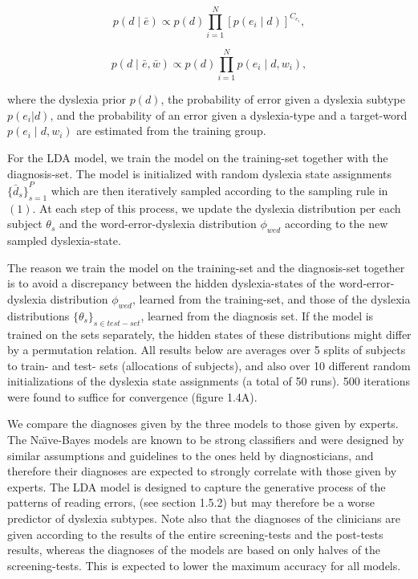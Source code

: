{{{\begin{equation}
p(d \mid \bar{e}) \propto p(d) \prod_{i = 1}^N [p(e_i \mid d)]^{C_{e_i}},
\end{equation}

\begin{equation}
p(d \mid \bar{e}, \bar{w}) \propto p(d) \prod_{i = 1}^N p(e_i \mid d, w_i),
\end{equation}

where the dyslexia prior $ p(d) $, the probability of error given a dyslexia subtype $ p(e_i |d) $, and the probability of an error given a dyslexia-type and a target-word $ p(e_i \mid d,w_i ) $ are estimated from the training group.

For the LDA model, we train the model on the training-set together with the diagnosis-set. The model is initialized with random dyslexia state assignments $ { \{ \bar{d}_{s} \} }_{s=1}^P $ which are then iteratively sampled according to the sampling rule in $(1)$. At each step of this process, we update the dyslexia distribution per each subject $ \theta_{s} $ and the word-error-dyslexia distribution $ \phi_{wed} $ according to the new sampled dyslexia-state.

The reason we train the model on the training-set and the diagnosis-set together is to avoid a discrepancy between the hidden dyslexia-states of the word-error-dyslexia distribution $ \phi_{wed} $, learned from the training-set, and those of the dyslexia distributions $ { \{ \theta_{s} \} }_{s \in test-set} $, learned from the diagnosis set. If the model is trained on the sets separately, the hidden states of these distributions might differ by a permutation relation. All results below are averages over 5 splits of subjects to train- and test- sets (allocations of subjects), and also over 10 different random initializations of the dyslexia state assignments (a total of 50 runs). 500 iterations were found to suffice for convergence (figure 1.4A).

We compare the diagnoses given by the three models to those given by experts. The Na\"{\i}ve-Bayes models are known to be strong classifiers and were designed by similar assumptions and guidelines to the ones held by diagnosticians, and therefore their diagnoses are expected to strongly correlate with those given by experts. The LDA model is designed to capture the generative process of the patterns of reading errors, (see section 1.5.2) but may therefore be a worse predictor of dyslexia subtypes. 
Note also that the diagnoses of the clinicians are given according to the results of the entire screening-tests and the post-tests results, whereas the diagnoses of the models are based on only halves of the screening-tests. This is expected to lower the maximum accuracy for all models.

}}}
